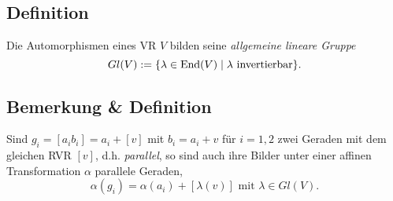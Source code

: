 \subsection{Definition}
	\begin{Definition}
	Die Automorphismen eines VR $ V $ bilden seine \emph{allgemeine lineare Gruppe}
		\[ Gl(V):= \{\lambda\in \operatorname{End}(V)\mid \lambda \text{ invertierbar}\}. \]
	\end{Definition}
\subsection{Bemerkung \& Definition}
	\begin{Definition}
	Sind $ g_i = [a_ib_i]=a_i + [v] $ mit $ b_i = a_i + v $ für $ i = 1,2 $ zwei Geraden mit dem gleichen RVR $ [v] $, d.h. \emph{parallel}, so sind auch ihre Bilder unter einer affinen Transformation $ \alpha $ parallele Geraden,
		\[ \alpha(g_i) = \alpha(a_i) + [\lambda(v)] \text{ mit } \lambda\in Gl(V). \]
	\end{Definition}
